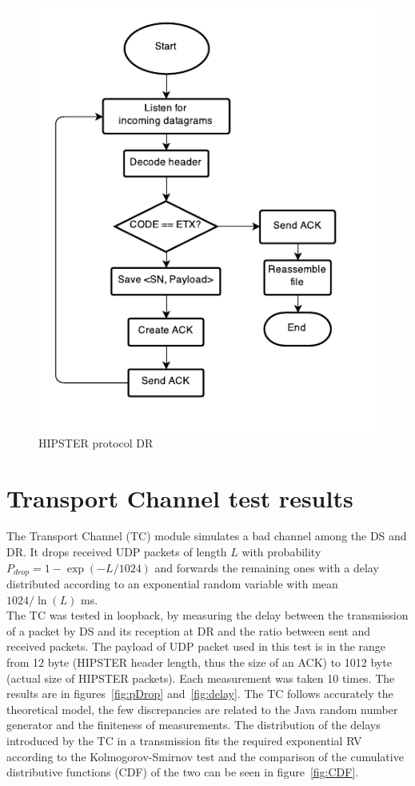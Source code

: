 \documentclass[10pt,twocolumn]{article}
\begin{document}
\begin{figure}[h]
  \centering
  \includegraphics[width=0.75\columnwidth, keepaspectratio]{Documentation/Receiver.pdf}
  \caption{HIPSTER protocol DR}
  \label{fig:receiverFlowchart}
\end{figure}

\section{Transport Channel test results}
The Transport Channel (TC) module simulates a bad channel among the DS and DR. It drops received UDP packets of length $L$ with probability $P_{drop} = 1 - \exp(-L/1024)$ and forwards the remaining ones with a delay distributed according to an exponential random variable with mean $1024/\ln(L)$ ms. \\
The TC was tested in loopback, by measuring the delay between the transmission of a packet by DS and its reception at DR and the ratio between sent and received packets. The payload of UDP packet used in this test is in the range from 12 byte (HIPSTER header length, thus the size of an ACK) to 1012 byte (actual size of HIPSTER packets). Each measurement was taken 10 times. The results are in figures~\ref{fig:pDrop} and~\ref{fig:delay}. The TC follows accurately the theoretical model, the few discrepancies are related to the Java random number generator and the finiteness of measurements. The distribution of the delays introduced by the TC in a transmission fits the required exponential RV according to the Kolmogorov-Smirnov test and the comparison of the cumulative distributive functions (CDF) of the two can be seen in figure~\ref{fig:CDF}.
\end{document}

